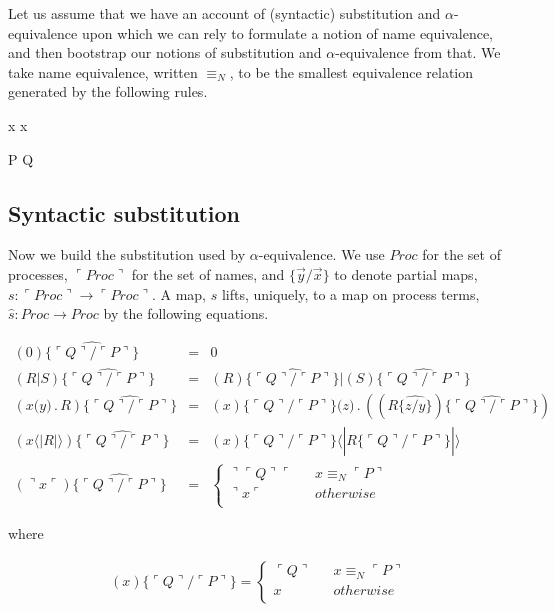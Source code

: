 \documentclass[]{entcs}
\newcommand{\lliftb}{\langle\!|}
\newcommand{\rliftb}{|\!\rangle}
\newcommand{\lpquote}{\ulcorner}
\newcommand{\rpquote}{\urcorner}
\newcommand{\id}[1]{\texttt{#1}}
\newcommand{\juxtap}{\mathbin{\id{|}}}
\newcommand{\concat}{\mathbin{.}}
\newcommand{\scong}{\mathbin{\equiv}}
\newcommand{\nameeq}{\mathbin{\equiv_N}}
\newcommand{\lift}[2]{#1 \lliftb #2 \rliftb}
\newcommand{\quotep}[1]{\lpquote #1 \rpquote}
\newcommand{\dropn}[1]{\rpquote #1 \lpquote}
\newcommand{\substp}[2]{\id{\{} \quotep{#1} / \quotep{#2} \id{\}}}
\newcommand{\substn}[2]{\id{\{} #1 / #2 \id{\}}}
\newcommand{\psubstp}[2]{\widehat{\substp{#1}{#2}}}
\newcommand{\psubstn}[2]{\widehat{\substn{#1}{#2}}}
\newcommand{\Proc}{\mathbin{Proc}}
\newcommand{\QProc}{\quotep{\mathbin{Proc}}}
\begin{document}
Let us assume that we have an account of (syntactic) substitution and
$\alpha$-equivalence upon which we can rely to formulate a notion of
name equivalence, and then bootstrap our notions of substitution and
$\alpha$-equivalence from that. We take name equivalence, written
$\nameeq$, to be the smallest equivalence relation generated by the
following rules.


{ \quotep{\dropn{x}} \nameeq x }

\infrule[Struct-equiv]
{ P \scong Q }
{ \quotep{P} \nameeq \quotep{Q} }

\subsection{Syntactic substitution}

Now we build the substitution used by $\alpha$-equivalence. We use
$\Proc$ for the set of processes, $\QProc$ for the set of names, and
$\id{\{}\vec{y} / \vec{x} \id{\}}$ to denote partial maps, $s : \QProc
\rightarrow \QProc$. A map, $s$ lifts, uniquely, to a map on process terms, $\widehat{s} :
\Proc \rightarrow \Proc$ by the following equations.

\begin{eqnarray}
(0) \psubstp{Q}{P}         & = &    0 \nonumber\\
(R \juxtap S) \psubstp{Q}{P}
		& = &    
		(R)\psubstp{Q}{P} \juxtap (S) \psubstp{Q}{P} \nonumber\\
(x \id{(} y\id{)}\concat R) \psubstp{Q}{P}    
		& = &    
		(x)\substp{Q}{P} \id{(}z\id{)}\concat( (R \psubstn{z}{y}) \psubstp{Q}{P} ) \nonumber\\
(\lift{x}{R}) \psubstp{Q}{P}  
 		& = &
 		\lift{(x)\substp{Q}{P}}{ R \psubstp{Q}{P} } \nonumber\\
(\dropn{x})  \psubstp{Q}{P}       
		& = & 
		\left\{ 
			\begin{array}{ccc} 
				\dropn{\quotep{Q}} & & x \nameeq \quotep{P} \\
                              	\dropn{x} & & otherwise \\
			\end{array}
		\right. \nonumber
\end{eqnarray}
 

where

\begin{eqnarray}
(x)\id{\{} \lpquote Q \rpquote / \lpquote P \rpquote \id{\}}            = 
		\left\{ 
			\begin{array}{ccc}
				\lpquote Q \rpquote & & x \nameeq \lpquote P \rpquote \\
                                x & & otherwise \\
			\end{array}
		\right. \nonumber
\end{eqnarray}
\end{document}
